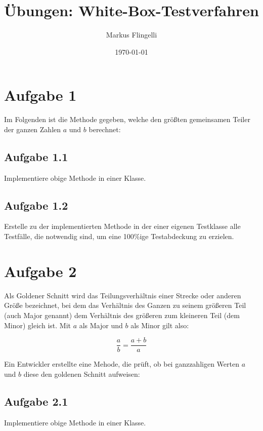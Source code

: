 

\title{Übungen: White-Box-Testverfahren}
\author{Markus Flingelli}
\date{\today}


\maketitle

\section*{Aufgabe 1}
Im Folgenden ist die Methode gegeben, welche den größten gemeinsamen Teiler der ganzen Zahlen $a$ und $b$ berechnet:



\subsection*{Aufgabe 1.1}

Implementiere obige Methode in einer Klasse.

\subsection*{Aufgabe 1.2}

Erstelle zu der implementierten Methode in der einer eigenen Testklasse alle Testfälle, die notwendig sind, um eine 100\%ige Testabdeckung zu erzielen.

\newpage
\section*{Aufgabe 2}
Als Goldener Schnitt wird das Teilungsverhältnis einer Strecke oder anderen Größe bezeichnet, bei dem das Verhältnis des Ganzen zu seinem größeren Teil (auch Major genannt) dem Verhältnis des größeren zum kleineren Teil (dem Minor) gleich ist. Mit $a$ als Major und $b$ als Minor gilt also:

\[  
\frac{a}{b} = \frac{a + b}{a}
\]

Ein Entwickler erstellte eine Mehode, die prüft, ob bei ganzzahligen Werten $a$ und $b$ diese den goldenen Schnitt aufweisen: 



\subsection*{Aufgabe 2.1}

Implementiere obige Methode in einer Klasse.

